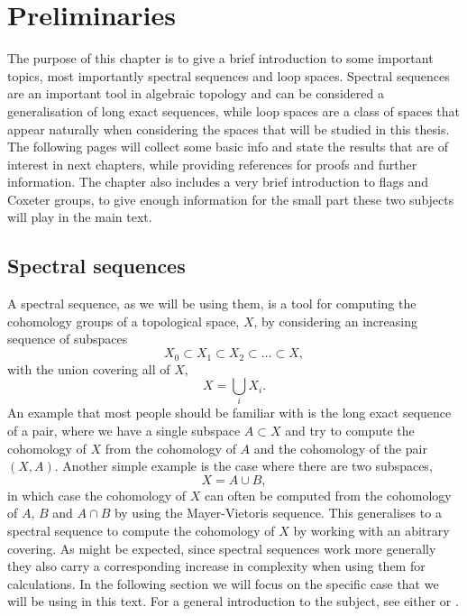 
\chapter{Preliminaries}
\label{chap:generelt}

The purpose of this chapter is to give a brief introduction to some
important topics, most importantly spectral sequences
and loop spaces. Spectral sequences are an important tool in algebraic
topology and can be considered a generalisation of long exact
sequences, while
loop spaces are a class of spaces that appear naturally when
considering the spaces that will be studied in this thesis. The
following pages will collect some basic info and state the results
that are of interest in next chapters, while providing references for
proofs and further information. The chapter also includes a very brief
introduction to flags and Coxeter groups, to give enough
information for the small part these two subjects will play in the
main text.

\section{Spectral sequences}
\label{sec:ss}

A spectral sequence, as we will be using them, is a tool for computing
the cohomology groups of a topological space, $X$, by considering an
increasing sequence of subspaces
\[ X_0 \subset X_1 \subset X_2 \subset \dots \subset X, \]
with the union covering all of $X$,
\[ X = \bigcup_{i} X_i. \]
An example that most people should be familiar with is the long exact
sequence of a pair, where
we have a single subspace $A \subset X$ and try to compute the
cohomology of $X$ from the cohomology of $A$ and the cohomology of the
pair $(X,A)$. Another simple example
is the case where there are two subspaces,
\[ X = A \cup B, \]
in which case the cohomology of $X$ can often be computed from the
cohomology of $A$, $B$ and $A\cap B$ by using the Mayer-Vietoris
sequence. This generalises to a spectral sequence to compute
the cohomology of $X$ by working with an abitrary covering. As might
be expected, since spectral sequences work more generally they also
carry a corresponding increase in complexity when using them for
calculations. In the following section we will focus on the specific
case that 
we will be using in this text. For a general introduction to the
subject, see either \cite{hatcherss} or \cite{mccleary}.

